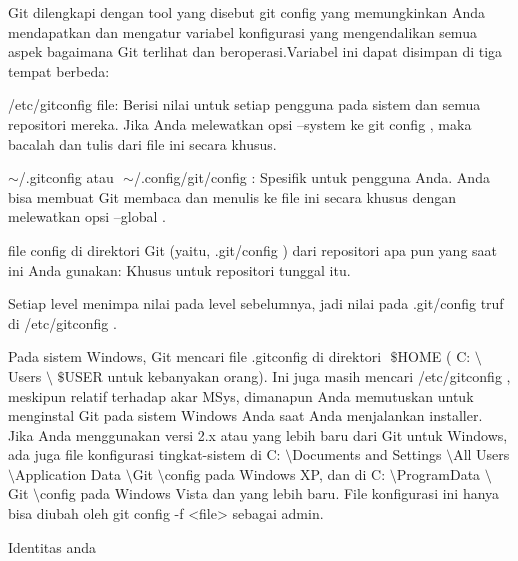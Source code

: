 \vspace{12pt}
\noindent 
Git dilengkapi dengan tool yang disebut $  $git config $  $yang memungkinkan Anda mendapatkan dan mengatur variabel konfigurasi yang mengendalikan semua aspek bagaimana Git terlihat dan beroperasi.Variabel ini dapat disimpan di tiga tempat berbeda: \par
\vspace{12pt}
\noindent 
/etc/gitconfig $  $file: Berisi nilai untuk setiap pengguna pada sistem dan semua repositori mereka. $  $Jika Anda melewatkan opsi $  $--system $  $ke $  $git config $  $, maka bacalah dan tulis dari file ini secara khusus. \par
\vspace{12pt}
\noindent 
 $  \sim  $/.gitconfig $  $atau $  $ $  \sim  $/.config/git/config $  $: Spesifik untuk pengguna Anda. $  $Anda bisa membuat Git membaca dan menulis ke file ini secara khusus dengan melewatkan opsi $  $--global $  $. \par
\vspace{12pt}
\noindent 
file $  $config $  $di direktori Git (yaitu, $  $.git/config $  $) dari repositori apa pun yang saat ini Anda gunakan: Khusus untuk repositori tunggal itu. \par
\vspace{12pt}
\noindent 
Setiap level menimpa nilai pada level sebelumnya, jadi nilai pada $  $.git/config $  $truf di $  $/etc/gitconfig $  $. \par
\noindent 
Pada sistem Windows, Git mencari file $  $.gitconfig $  $di direktori $  $ $  \$  $HOME $  $( $  $C: $  \setminus  $Users $  \setminus  $ $  \$  $USER $  $untuk kebanyakan orang). $  $Ini juga masih mencari $  $/etc/gitconfig $  $, meskipun relatif terhadap akar MSys, dimanapun Anda memutuskan untuk menginstal Git pada sistem Windows Anda saat Anda menjalankan installer. $  $Jika Anda menggunakan versi 2.x atau yang lebih baru dari Git untuk Windows, ada juga file konfigurasi tingkat-sistem di $  $C: $  \setminus  $Documents and Settings $  \setminus  $All Users $  \setminus  $Application Data $  \setminus  $Git $  \setminus  $config $  $pada Windows XP, dan di $  $C: $  \setminus  $ProgramData $  \setminus  $Git $  \setminus  $config $  $pada Windows Vista dan yang lebih baru. $  $File konfigurasi ini hanya bisa diubah oleh $  $git config -f <file> $  $sebagai admin. \par
\vspace{12pt}
\noindent 
Identitas anda \par
\vspace{12pt}
